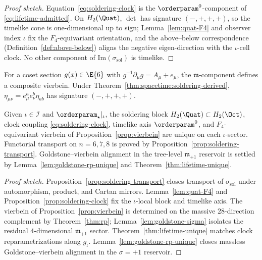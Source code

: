 \begin{proof}[Proof sketch]
Equation~\eqref{eq:soldering-clock} is the $\orderparam^0$-component of
\eqref{eq:lifetime-admitted}. On $H_2(\Quat)$, $\det$ has signature
$(-,+,+,+)$, so the timelike cone is one-dimensional up to sign;
Lemma~\ref{lem:quat-F4} and observer index $\iota$ fix the
$F_4$-equivariant orientation, and the above--below correspondence
(Definition~\ref{def:above-below}) aligns the negative eigen-direction
with the $\iota$-cell clock. No other component of
$\mathrm{Im}(\sigma_{\mathrm{sol}})$ is timelike.
\end{proof}

\begin{proposition}\label{prop:vierbein}
For a coset section $g(x)\in\E{6}$ with $g^{-1}\partial_\mu g=A_\mu+e_\mu$,
the $\mathfrak{m}$-component defines a composite vierbein. Under
Theorem~\ref{thm:spacetime:soldering-derived},
$\eta_{\mu\nu}=e^a_\mu e^b_\nu\eta_{ab}$ has signature $(-,+,+,+)$.
\end{proposition}

\begin{theorem}
\label{thm:soldering-unique}
Given $\iota\in\mathcal{I}$ and $\orderparam_\star|_\iota$, the soldering
block $H_2(\Quat)\subset H_2(\Oct)$, clock coupling
\eqref{eq:soldering-clock}, timelike axis $\orderparam^0$, and
$F_4$-equivariant vierbein of Proposition~\ref{prop:vierbein} are unique on
each $\iota$-sector. Functorial transport on $n=6,7,8$ is proved by
Proposition~\ref{prop:soldering-transport}. Goldstone--vierbein alignment in
the tree-level $\mathfrak{m}_{+1}$ reservoir is settled by
Lemma~\ref{lem:goldstone-rp-unique} and
Theorem~\ref{thm:lifetime-unique}.
\end{theorem}

\begin{proof}[Proof sketch]
Proposition~\ref{prop:soldering-transport} closes transport of
$\sigma_{\mathrm{sol}}$ under automorphism, product, and Cartan mirrors.
Lemma~\ref{lem:quat-F4} and Proposition~\ref{prop:soldering-clock} fix the
$\iota$-local block and timelike axis. The vierbein of
Proposition~\ref{prop:vierbein} is determined on the massive $28$-direction
complement by Theorem~\ref{thm:rp}; Lemma~\ref{lem:goldstone-sigma}
isolates the residual $4$-dimensional $\mathfrak{m}_{+1}$ sector.
Theorem~\ref{thm:lifetime-unique} matches clock reparametrizations along
$g_\iota$. Lemma~\ref{lem:goldstone-rp-unique} closes massless
Goldstone--vierbein alignment in the $\sigma=+1$ reservoir.
\end{proof}

